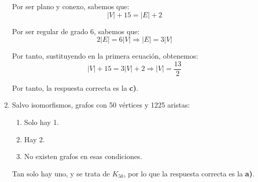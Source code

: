 \begin{ejercicio}
\begin{enumerate}
        Por ser plano y conexo, sabemos que:
        \begin{equation*}
            |V|+15=|E|+2
        \end{equation*}

        Por ser regular de grado $6$, sabemos que:
        \begin{equation*}
            2|E|=6|V|\Longrightarrow |E|=3|V|
        \end{equation*}

        Por tanto, sustituyendo en la primera ecuación, obtenemos:
        \begin{equation*}
            |V|+15=3|V|+2\Longrightarrow |V|=\frac{13}{2}
        \end{equation*}

        Por tanto, la respuesta correcta es la \textbf{c)}.
        \item Salvo isomorfismos, grafos con 50 vértices y 1225 aristas:
        \begin{enumerate}
            \item Solo hay 1.
            \item Hay 2.
            \item No existen grafos en esas condiciones.
        \end{enumerate}
        Tan solo hay uno, y se trata de $K_{50}$, por lo que la respuesta correcta es la \textbf{a)}.
    \end{enumerate}
\end{ejercicio}


